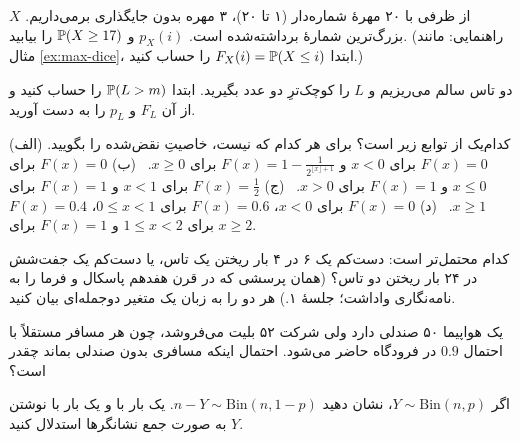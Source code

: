\begin{exercise}[\lr{Ross}]
از ظرفی با ۲۰ مهرهٔ شماره‌دار (۱ تا ۲۰)، ۳ مهره بدون جایگذاری برمی‌داریم. $X$ بزرگ‌ترین شمارهٔ برداشته‌شده است. $p_X(i)$ و $\P(X\ge17)$ را بیابید. (راهنمایی: مانند مثال \ref{ex:max-dice}، ابتدا $F_X(i)=\P(X\le i)$ را حساب کنید.)
\end{exercise}

\begin{exercise}
دو تاس سالم می‌ریزیم و $L$ را کوچک‌ترِ دو عدد بگیرید. ابتدا $\P(L>m)$ را حساب کنید و از آن $F_L$ و $p_L$ را به دست آورید.
\end{exercise}

\begin{exercise}
کدام‌یک از توابع زیر  است؟ برای هر کدام که نیست، خاصیتِ نقض‌شده را بگویید.
(الف) $F(x)=0$ برای $x<0$ و $F(x)=1-\tfrac1{2^{\lfloor x\rfloor+1}}$ برای $x\ge0$. \
(ب) $F(x)=0$ برای $x\le0$ و $F(x)=1$ برای $x>0$. \
(ج) $F(x)=\tfrac12$ برای $x<1$ و $F(x)=1$ برای $x\ge1$. \
(د) $F(x)=0$ برای $x<0$، $F(x)=0.6$ برای $0\le x<1$، $F(x)=0.4$ برای $1\le x<2$ و $F(x)=1$ برای $x\ge2$.
\end{exercise}

\begin{exercise}
کدام محتمل‌تر است: دست‌کم یک ۶ در ۴ بار ریختن یک تاس، یا دست‌کم یک جفت‌شش در ۲۴ بار ریختن دو تاس؟ (همان پرسشی که در قرن هفدهم پاسکال و فرما را به نامه‌نگاری واداشت؛ جلسهٔ ۱.) هر دو را به زبان یک متغیر دوجمله‌ای بیان کنید.
\end{exercise}

\begin{exercise}
یک هواپیما ۵۰ صندلی دارد ولی شرکت ۵۲ بلیت می‌فروشد، چون هر مسافر مستقلاً با احتمال $0.9$ در فرودگاه حاضر می‌شود. احتمال اینکه مسافری بدون صندلی بماند چقدر است؟
\end{exercise}

\begin{exercise}
اگر $Y\sim\mathrm{Bin}(n,p)$، نشان دهید $n-Y\sim\mathrm{Bin}(n,1-p)$. یک بار با  و یک بار با نوشتن $Y$ به صورت جمع نشانگرها استدلال کنید.
\end{exercise}

